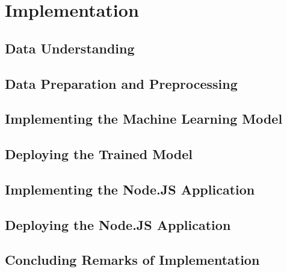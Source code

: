 \chapter{Implementation}

\section{Data Understanding}

\section{Data Preparation and Preprocessing}



\section{Implementing the Machine Learning Model}

\section{Deploying the Trained Model}

\section{Implementing the Node.JS Application}

\section{Deploying the Node.JS Application}





\section{Concluding Remarks of Implementation}
